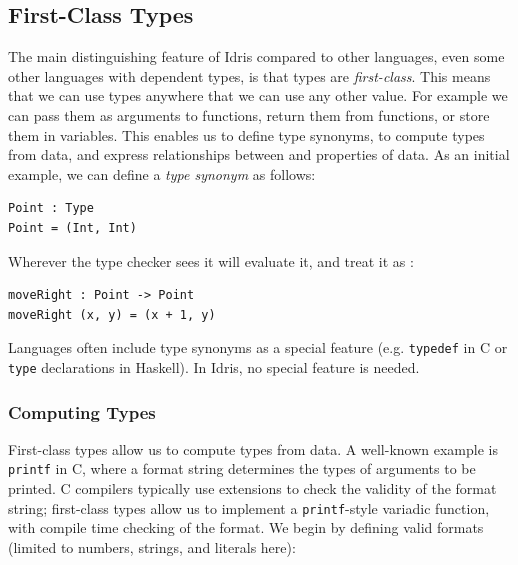 \subsection{First-Class Types}

The main distinguishing feature of Idris compared to other languages, even
some other languages with dependent types, is that types are \emph{first-class}.
This means that we can use types anywhere that we can use any other value.
For example we can pass them as arguments to functions, return them from
functions, or store them in variables. This enables us to define type synonyms,
to compute types from data, and express relationships between and properties
of data.
% 
% 
As an initial example, we can define a \emph{type synonym} as follows:

\begin{lstlisting}
Point : Type
Point = (Int, Int)
\end{lstlisting}

Wherever the type checker sees  it will evaluate it,
and treat it as :

\begin{lstlisting}
moveRight : Point -> Point
moveRight (x, y) = (x + 1, y)
\end{lstlisting}

Languages often include type synonyms as a special feature (e.g.
\texttt{typedef} in C or \texttt{type} declarations in Haskell). In Idris,
no special feature is needed. 

\subsubsection{Computing Types}

\label{sec:printf}

First-class types allow us to compute types from data.
A well-known example is \texttt{printf} in C, where
a format string determines the types of arguments to be printed.
C compilers typically use extensions to check the validity of the format string;
first-class types allow us to implement a \texttt{printf}-style variadic
function, with compile time checking of the format. We begin by defining
valid formats (limited to numbers, strings, and literals here):

